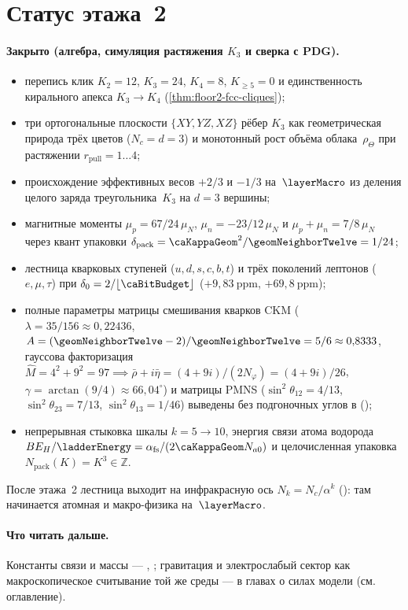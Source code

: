 \section{Статус этажа~2}
\label{sec:floor2-open}

\paragraph{Закрыто (алгебра, симуляция растяжения $K_3$ и сверка с PDG).}
\begin{itemize}[noitemsep]
\item перепись клик $K_2=12$, $K_3=24$, $K_4=8$, $K_{\ge 5}=0$ и единственность кирального апекса $K_3\to K_4$ (\cref{thm:floor2-fcc-cliques});
\item три ортогональные плоскости $\{XY,YZ,XZ\}$ рёбер $K_3$ как геометрическая природа трёх цветов ($N_c=d=3$) и монотонный рост объёма облака~$\rho_\Theta$ при растяжении $r_{\mathrm{pull}}=1\ldots 4$;
\item происхождение эффективных весов $+2/3$ и $-1/3$ на~$\layerMacro$ из деления целого заряда треугольника~$K_3$ на $d=3$ вершины;
\item магнитные моменты $\mu_p=67/24\,\mu_N$, $\mu_n=-23/12\,\mu_N$ и $\mu_p+\mu_n=7/8\,\mu_N$ через квант упаковки $\delta_{\mathrm{pack}}=\caKappaGeom^2/\geomNeighborTwelve=1/24$;
\item лестница кварковых ступеней ($u,d,s,c,b,t$) и трёх поколений лептонов ($e,\mu,\tau$) при $\delta_0=2/\lfloor\caBitBudget\rfloor$ ($+9{,}83\ \mathrm{ppm}$, $+69{,}8\ \mathrm{ppm}$);
\item полные параметры матрицы смешивания кварков CKM ($\lambda = 35/156 \approx 0{,}22436$, $A = (\geomNeighborTwelve-2)/\geomNeighborTwelve = 5/6 \approx 0{,}8333$, гауссова факторизация $\hat M = 4^2+9^2 = 97 \implies \bar\rho + i\bar\eta = (4+9i)/(2N_\varphi) = (4+9i)/26$, $\gamma = \arctan(9/4) \approx 66{,}04^\circ$) и матрицы PMNS ($\sin^2\theta_{12}=4/13$, $\sin^2\theta_{23}=7/13$, $\sin^2\theta_{13}=1/46$) выведены без подгоночных углов в  ();
\item непрерывная стыковка шкалы $k=5\to 10$, энергия связи атома водорода $BE_H/\ladderEnergy=\alpha_{\mathrm{fs}}/(2\caKappaGeom N_{a0})$ и целочисленная упаковка $N_{\mathrm{pack}}(K)=K^3\in\mathbb{Z}$.
\end{itemize}

После этажа~2 лестница выходит на инфракрасную ось
$N_k=N_c/\alpha^{k}$ (): там начинается атомная и макро-физика на~$\layerMacro$.

\paragraph{Что читать дальше.}
Константы связи и массы --- , ;
гравитация и электрослабый сектор как макроскопическое считывание той же среды --- в главах о силах модели
(см. оглавление).
